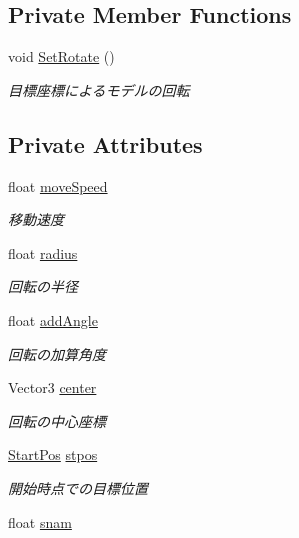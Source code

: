 \subsection*{Private Member Functions}
\begin{DoxyCompactItemize}
\item 
void \hyperlink{class_bone_a2741ce8e7ff43d5e84eb8c9be535e444}{Set\+Rotate} ()
\begin{DoxyCompactList}\small\item\em 目標座標によるモデルの回転 \end{DoxyCompactList}\end{DoxyCompactItemize}
\subsection*{Private Attributes}
\begin{DoxyCompactItemize}
\item 
float \hyperlink{class_bone_a3001403c110fc94d175a6f20cfbb7969}{move\+Speed}
\begin{DoxyCompactList}\small\item\em 移動速度 \end{DoxyCompactList}\item 
float \hyperlink{class_bone_a1620b184247a0ea1adad2238de98eaf3}{radius}
\begin{DoxyCompactList}\small\item\em 回転の半径 \end{DoxyCompactList}\item 
float \hyperlink{class_bone_ae1b6787fe1fb6d6ffc39ac64c7ef4910}{add\+Angle}
\begin{DoxyCompactList}\small\item\em 回転の加算角度 \end{DoxyCompactList}\item 
Vector3 \hyperlink{class_bone_a0177e90c13081ecb6b3b476f25e58b53}{center}
\begin{DoxyCompactList}\small\item\em 回転の中心座標 \end{DoxyCompactList}\item 
\hyperlink{class_bone_a4e9643808aa3b00b96fcd597c46f00b1}{Start\+Pos} \hyperlink{class_bone_ab022c426d0189d797ea4a34acb51fb48}{stpos}
\begin{DoxyCompactList}\small\item\em 開始時点での目標位置 \end{DoxyCompactList}\item 
float \hyperlink{class_bone_ab8b4fbcb5d6a56ad5598bc45efd9bd8a}{snam}

\end{DoxyCompactItemize}
